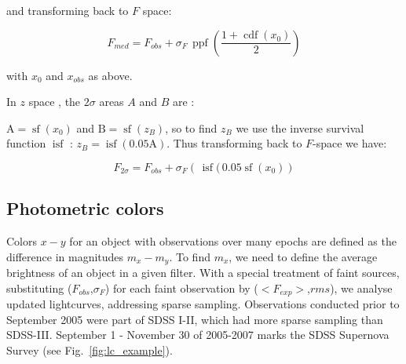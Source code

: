 \documentclass[fleqn,usenatbib]{mnras}  %
\DeclareMathOperator\cdf{cdf}
\DeclareMathOperator\sf{sf}
\DeclareMathOperator\isf{isf}
\DeclareMathOperator\ppf{ppf}
\begin{document}
and transforming back to $F$ space: 

\begin{equation}
F_{med} = F_{obs} + \sigma_{F} \, \ppf \left( \frac{1+\cdf(x_{0})}{2} \right)
\end{equation}

with $x_{0}$ and $x_{obs}$ as above.  

\bigskip

In $z$  space , the $2\sigma$ areas  $A$ and $B$ are :

$\text{A} = \sf(x_{0})$ and $\text{B} = \sf(z_{B})$, so to find  $z_{B}$ we use the  inverse survival function $\isf$ : $z_{B} = \isf(0.05 \text{A})$. Thus transforming back to $F$-space we have:

\begin{equation}
F_{2\sigma} = F_{obs} + \sigma_{F} \left(\, \isf (\, 0.05 \sf (x_{0})  \right)
\end{equation}


\subsection{Photometric colors}

Colors $x-y$ for an object with observations over many epochs are defined as the difference in magnitudes $m_{x} - m_{y}$. To find $m_{x}$, we need to define the average brightness of an object in  a given filter. With a special treatment of faint sources, substituting ($F_{obs}$,$\sigma_F$) for each faint observation by ($<F_{exp}>$,$rms$), we analyse updated lightcurves, addressing sparse sampling. Observations conducted prior to September 2005 were part of SDSS I-II, which had more sparse sampling than SDSS-III. September 1 - November 30 of 2005-2007 marks the SDSS Supernova Survey (see Fig.~\ref{fig:lc_example}).  
\end{document}
